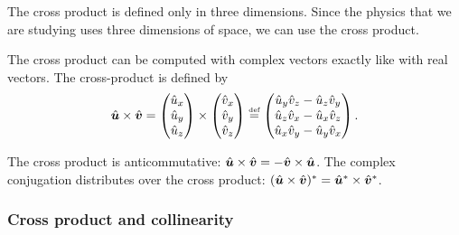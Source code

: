 The cross product is defined only in three dimensions.
Since the physics that we are studying uses three dimensions of space, we can use the cross product.

The cross product can be computed with complex vectors exactly like with real vectors.
The cross-product is defined by
\begin{equation}
    \hat{\bm{u}} \times \hat{\bm{v}}
    =
    \begin{pmatrix}
        \hat{u}_x \\ \hat{u}_y \\ \hat{u}_z
    \end{pmatrix}
    \times
    \begin{pmatrix}
        \hat{v}_x \\ \hat{v}_y \\ \hat{v}_z
    \end{pmatrix}
    \stackrel{\text{\tiny def}}{=}
    \begin{pmatrix}
        \hat{u}_y \hat{v}_z - \hat{u}_z \hat{v}_y\\
        \hat{u}_z \hat{v}_x - \hat{u}_x \hat{v}_z\\
        \hat{u}_x \hat{v}_y - \hat{u}_y \hat{v}_x
    \end{pmatrix}
    \text{.}
\end{equation}

The cross product is anticommutative:
$\hat{\bm{u}} \times \hat{\bm{v}} = -\hat{\bm{v}} \times \hat{\bm{u}}$.
The complex conjugation distributes over the cross product:
$(\hat{\bm{u}} \times \hat{\bm{v}})^* = \hat{\bm{u}}^* \times \hat{\bm{v}}^*$.


\subsubsection{Cross product and collinearity}

